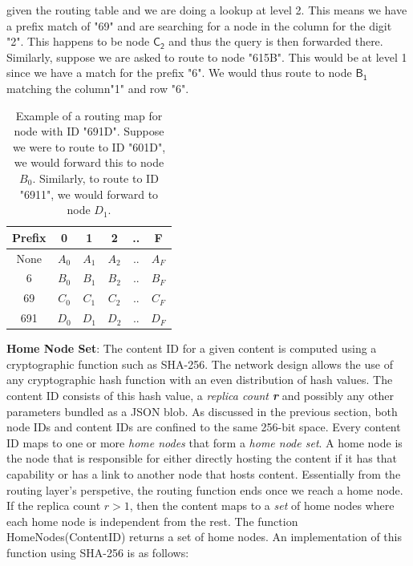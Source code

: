 given the routing table and we are doing a lookup at level 2. This means we have a prefix match of "69" and are
searching for a node in the column for the digit "2". This happens to be node \(\textsf{C}_\textsf{2}\) and thus the query is then
forwarded there. Similarly, suppose we are asked to route to node "615B". This would be at level 1 since we have a match
for the prefix "6". We would thus route to node \(\textsf{B}_\textsf{1}\) matching the column"1" and row "6".
\begin{table}[h]
\begin{center}
    \renewcommand{\arraystretch}{1.5}
\begin{tabular} {| c | c | c | c | c | c |}
    \hline
    Prefix & 0 & 1 & 2 & .. & F \\
    \hline
    \hline
    None & \(A_0\) & \(A_1\) & \(A_2\) & .. & \(A_F\) \\
    6 & \(B_0\) & \(B_1\) & \(B_2\) & .. & \(B_F\) \\
    69 & \(C_0\) & \(C_1\) & \(C_2\) & .. & \(C_F\) \\
    691 & \(D_0\) & \(D_1\) & \(D_2\) & .. & \(D_F\) \\
    \hline
\end{tabular}
\label{table:routing_map}
\caption{Example of a routing map for node with ID "691D". Suppose we were to route to ID "601D", we would forward this
    to node \(B_0\). Similarly, to route to ID "6911", we would forward to node \(D_1\).}
\end{center}
\end{table}
\textbf{\newline Home Node Set}: The content ID for a given content is computed using a cryptographic function such as SHA-256. The
network design allows the use of any cryptographic hash function with an even distribution of hash values. The content ID 
consists of this hash value, a {\em replica count {\bf r}} and possibly any other parameters bundled as a JSON blob.
As discussed in the previous section, both node IDs and content IDs are confined to the same 256-bit space.  Every content ID
maps to one or more {\em home nodes} that form a {\em home node set}. A home node is the node that is responsible for
either directly hosting the content if it has that capability or has a link to another node that hosts content.
Essentially from the routing layer's perspetive, the routing function ends once we reach a home node. If the replica
count \( r > 1\), then the content maps to a {\em set} of home nodes where each home node is independent from the rest. The function \textsf{HomeNodes(ContentID)} returns a set of home nodes. An implementation of this function using SHA-256 is as follows:
